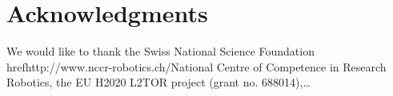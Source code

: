 \documentclass{sig-alternate-05-2015}
\begin{document}
\section{Acknowledgments}
We would like to thank the Swiss National Science Foundation 
href{http://www.nccr-robotics.ch/}{National Centre of Competence in Research 
Robotics}, the EU H2020 L2TOR project (grant no. 688014),\dots


  
\end{document}
